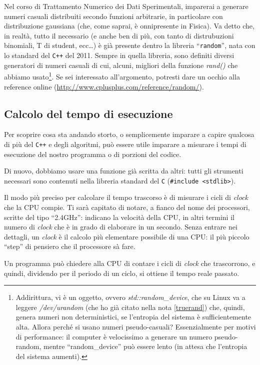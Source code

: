 Nel corso di Trattamento Numerico dei Dati Sperimentali, imparerai a generare numeri  casuali distribuiti secondo funzioni arbitrarie, in particolare con distribuzione gaussiana (che, come saprai, è onnipresente in Fisica). Va detto che, in realtà, tutto il necessario (e anche ben di più, con tanto di distrubuzioni binomiali, T di student, ecc\ldots) è già presente dentro la libreria ``\verb|random|'', nata con lo standard del \verb|C++| del 2011. Sempre in quella libreria, sono definiti diversi generatori di numeri casuali di cui, alcuni, migliori della funzione  \emph{rand()} che abbiamo usato\footnote{Addirittura, vi è un oggetto, ovvero \emph{std::random\_device}, che su Linux va a leggere \emph{/dev/urandom} (che ho già citato nella nota \ref{truerand}) che, quindi, genera numeri non deterministici, se l'entropia del sistema è sufficientemente alta. Allora perché si usano numeri pseudo-casuali? Essenzialmente per motivi di performance: il computer è velocissimo a generare un numero pseudo-random, mentre ``random\_device'' può essere lento (in attesa che l'entropia del sistema aumenti).}. Se sei interessato all'argomento, potresti dare un occhio alla reference online (\url{http://www.cplusplus.com/reference/random/}).
\subsection{Calcolo del tempo di esecuzione}
Per scoprire cosa sta andando storto, o semplicemente imparare a capire qualcosa di più del \verb|C++| e degli algoritmi, può essere utile imparare a misurare i tempi di esecuzione del nostro programma o di porzioni del codice.

Di nuovo, dobbiamo usare una funzione già scritta da altri: tutti gli strumenti necessari sono contenuti nella libreria standard del \verb|C| (\verb|#include <stdlib>|).

Il modo più preciso per calcolare il tempo trascorso è di misurare i cicli di \emph{clock} che la CPU compie. Ti sarà capitato di notare, a fianco del nome dei processori, scritte del tipo ``2.4GHz'': indicano la velocità della CPU, in altri termini il numero di \emph{clock} che è in grado di elaborare in un secondo. Senza entrare nei dettagli, un \emph{clock} è il calcolo più elementare possibile di una CPU: il più piccolo ``step'' di pensiero che il processore sà fare.

Un programma può chiedere alla CPU di contare i cicli di \emph{clock} che trascorrono, e quindi, dividendo per il periodo di un ciclo, si ottiene il tempo reale passato. 

